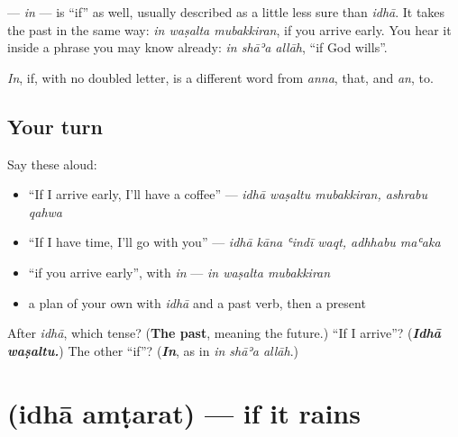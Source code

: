 \begin{grammarlens}[title={Grammar Lens: in, the other \textquotedblleft{}if\textquotedblright{}}]
\textbf{} — \emph{in} — is \textquotedblleft{}if\textquotedblright{} as well, usually described as a little less sure than \emph{idhā}. It takes the past in the same way: \emph{in waṣalta mubakkiran}, if you arrive early. You hear it inside a phrase you may know already: \emph{in shāʾa allāh}, \textquotedblleft{}if God wills\textquotedblright{}.

\emph{In}, if, with no doubled letter, is a different word from \emph{anna}, that, and \emph{an}, to.
\end{grammarlens}

\subsection*{Your turn}
Say these aloud:

\begin{itemize}
\raggedright
  \item \textquotedblleft{}If I arrive early, I'll have a coffee\textquotedblright{} — \emph{idhā waṣaltu mubakkiran, ashrabu qahwa}
  \item \textquotedblleft{}If I have time, I'll go with you\textquotedblright{} — \emph{idhā kāna ʿindī waqt, adhhabu maʿaka}
  \item \textquotedblleft{}if you arrive early\textquotedblright{}, with \emph{in} — \emph{in waṣalta mubakkiran}
  \item a plan of your own with \emph{idhā} and a past verb, then a present
\end{itemize}

\begin{tcolorbox}[breakable,colback=teal!4,colframe=teal!35!black,title={Before you move on}]
After \emph{idhā}, which tense? (\textbf{The past}, meaning the future.) \textquotedblleft{}If I arrive\textquotedblright{}? (\emph{\textbf{Idhā waṣaltu.}}) The other \textquotedblleft{}if\textquotedblright{}? (\emph{\textbf{In}}, as in \emph{in shāʾa allāh}.)
\end{tcolorbox}
\section[\texorpdfstring{\ar{إذا} \ar{أمطرت} (idhā amṭarat)}{إذا أمطرت (idhā amṭarat)}]{  (idhā amṭarat) — if it rains}

\label{lesson:AR-C291-idha-amtarat}



